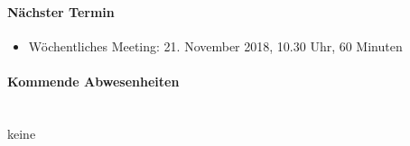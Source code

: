 \paragraph{Nächster Termin}
\begin{itemize}	
	\item Wöchentliches Meeting: 21. November 2018, 10.30 Uhr, 60 Minuten
\end{itemize}

\paragraph{Kommende Abwesenheiten} \mbox{}\\
keine